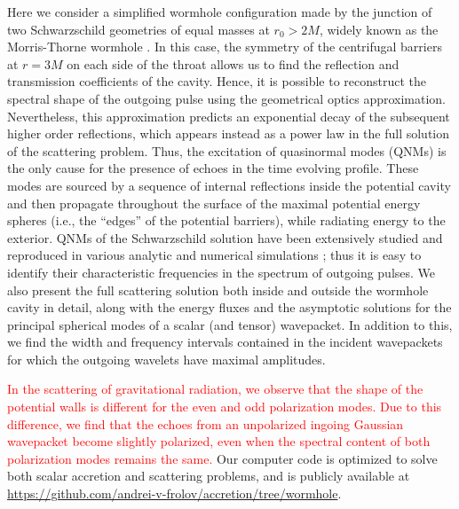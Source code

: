 \documentclass[article,aps,nofootinbib,twocolumn,superscriptaddress]{revtex4-1}
\begin{document}
Here we consider a simplified wormhole configuration made by the junction of two Schwarzschild geometries of equal masses at $r_0>2M$, widely known as the Morris-Thorne wormhole \citep{Cardoso:2016oxy, doi:10.1119/1.15620}. In this case, the symmetry of the centrifugal barriers at $r=3M$ on each side of the throat allows us to find the reflection and transmission coefficients of the cavity. Hence, it is possible to reconstruct the spectral shape of the outgoing pulse using the geometrical optics approximation. Nevertheless, this approximation predicts an exponential decay of the subsequent higher order reflections, which appears instead as a power law in the full solution of the scattering problem. Thus, the excitation of quasinormal modes (QNMs) is the only cause for the presence of echoes in the time evolving profile. These modes are sourced by a sequence of internal reflections inside the potential cavity and then propagate throughout the surface of the maximal potential energy spheres (i.e., the ``edges'' of the potential barriers), while radiating energy to the exterior. QNMs of the Schwarzschild solution have been extensively studied and reproduced in various analytic and numerical simulations \citep{Chandrasekhar:1975zza, PhysRevD.46.4179}; thus it is easy to identify their characteristic frequencies in the spectrum of outgoing pulses. We also present the full scattering solution both inside and outside the wormhole cavity in detail, along with the energy fluxes and the asymptotic solutions for the principal spherical modes of a scalar (and tensor) wavepacket. In addition to this, we find the width and frequency intervals contained in the incident wavepackets for which the outgoing wavelets have maximal amplitudes.

\textcolor{red}{In the scattering of gravitational radiation, we observe that the shape of the potential walls is different for the even and odd polarization modes. Due to this difference, we find that the echoes from an unpolarized ingoing Gaussian wavepacket become slightly polarized, even when the spectral content of both polarization modes remains the same.} Our computer code is optimized to solve both scalar accretion and scattering problems, and is publicly available at \url{https://github.com/andrei-v-frolov/accretion/tree/wormhole}.
\end{document}
